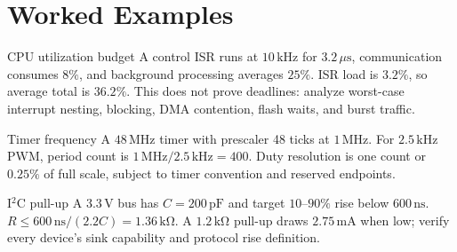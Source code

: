 \documentclass[10pt,letterpaper]{article}
\begin{document}
\section{Worked Examples}
\begin{CornellExamBox}{CPU utilization budget}
A control ISR runs at $10\,\mathrm{kHz}$ for $3.2\,\mu\mathrm{s}$, communication consumes $8\%$, and background processing averages $25\%$. ISR load is $3.2\%$, so average total is $36.2\%$. This does not prove deadlines: analyze worst-case interrupt nesting, blocking, DMA contention, flash waits, and burst traffic.
\end{CornellExamBox}
\begin{CornellExamBox}{Timer frequency}
A $48\,\mathrm{MHz}$ timer with prescaler 48 ticks at $1\,\mathrm{MHz}$. For $2.5\,\mathrm{kHz}$ PWM, period count is $1\,\mathrm{MHz}/2.5\,\mathrm{kHz}=400$. Duty resolution is one count or $0.25\%$ of full scale, subject to timer convention and reserved endpoints.
\end{CornellExamBox}
\begin{CornellExamBox}{I$^2$C pull-up}
A $3.3\,\mathrm{V}$ bus has $C=200\,\mathrm{pF}$ and target $10$--$90\%$ rise below $600\,\mathrm{ns}$. $R\le600\,\mathrm{ns}/(2.2C)=1.36\,\mathrm{k\Omega}$. A $1.2\,\mathrm{k\Omega}$ pull-up draws $2.75\,\mathrm{mA}$ when low; verify every device's sink capability and protocol rise definition.
\end{CornellExamBox}
\end{document}
